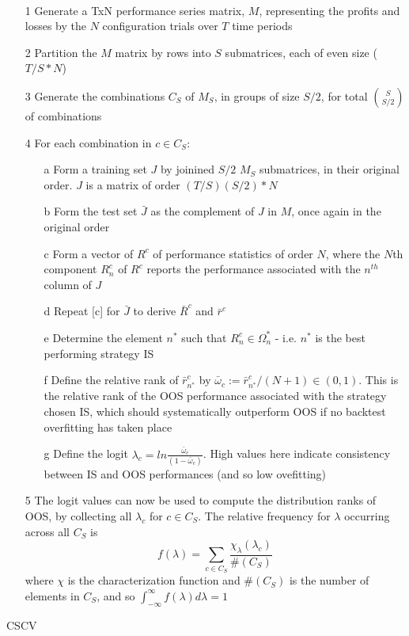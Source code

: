 \documentclass[a4paper,11pt,oneside]{article}
\theoremstyle{plain}
\theoremstyle{definition}
\begin{document}
\begin{algorithm}[H]
	\texttt{\\}
		
	\begin{itemize}
			\item[1]Generate a TxN performance series matrix, $M$, representing the profits and losses by the $N$ configuration trials over $T$ time periods
			\item[2]Partition the $M$ matrix by rows into $S$ submatrices, each of even size ($T/S * N$)
			\item[3]Generate the combinations $C_S$ of $M_S$, in groups of size $S/2$, for total $\binom{S}{S/2}$ of combinations
			\item[4]For each combination in $c \in C_S$:
			\begin{itemize}
				\item [a] Form a training set $J$ by joinined $S/2$ $M_S$ submatrices, in their original order. $J$ is a matrix of order $(T/S)(S/2)*N $
				\item [b] Form the test set $\bar{J}$ as the complement of $J$ in $M$, once again in the original order
				\item [c] Form a vector of $R^c$ of performance statistics of order $N$, where the $N$th component $R_n^c$ of $R^c$ reports the performance associated with the $n^{th}$ column of $J$
				\item [d] Repeat [c] for $\bar{J}$ to derive $\bar{R}^c$ and $\bar{r}^c$
				\item [e] Determine the element $n^*$ such that $R^c_n \in \Omega^*_n$ - i.e. $n^*$ is the best performing strategy IS
				\item [f] Define the relative rank of $\bar{r}^c_{n^*}$ by $\bar{\omega}_c := \bar{r}^c_{n^*} / (N +1) \in (0,1)$. This is the relative rank of the OOS performance associated with the strategy chosen IS, which should systematically outperform OOS if no backtest overfitting has taken place
				\item[g] Define the logit $\lambda_c = ln \frac{\bar{\omega}_c}{(1-\bar{\omega}_c)}$. High values here indicate consistency between IS and OOS performances (and so low ovefitting)
			\end{itemize}
			\item [5] The logit values can now be used to compute the distribution ranks of OOS, by collecting all $\lambda_c$ for $c \in C_S$. The relative frequency for $\lambda$ occurring across all $C_S$ is 
			\begin{equation}
			f(\lambda) = \sum_{c \in C_S}\frac{\chi_{\lambda}(\lambda_c)}{\#(C_S)}
			\end{equation}
			where $\chi$ is the characterization function and $\#(C_S)$ is the number of elements in $C_S$, and so $\int_{-\infty}^{\infty} f (\lambda) d \lambda = 1$
		\end{itemize}
	
	\label{algo_cscv}
	\caption{CSCV}
\end{algorithm}
\end{document}
